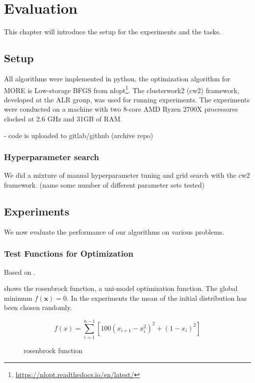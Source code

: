 
\chapter{Evaluation}
This chapter will introduce the setup for the experiments and the tasks.

\section{Setup}
All algorithms were implemented in python,
the optimization algorithm for MORE is Low-storage BFGS
from nlopt\footnote{\href{https://nlopt.readthedocs.io/en/latest/}{https://nlopt.readthedocs.io/en/latest/}}.
The clusterwork2 (cw2) framework, developed at the ALR group, was used for running experiments.
The experiments were conducted on a machine with two 8-core
AMD Ryzen 2700X processores clocked at 2.6 GHz and 31GB of RAM.

- code is uploaded to gitlab/github (archive repo)

\subsection{Hyperparameter search}
We did a mixture of manual hyperparameter tuning and grid search
with the cw2 framework. (name some number of different parameter
sets tested)

\section{Experiments}
We now evaluate the performance of our algorithms on various problems.

\subsection{Test Functions for Optimization}
Based on \citet{molga2005test}.

 shows the rosenbrock function, a uni-model optimization function. The global minimum $f(\mathbf{x}) = 0$. In the experiments
the mean of the initial distribution has been chosen randomly.

$$ f(x) = \sum^{n-1}_{i=1} [100(x_{i+1} - x_i^2)^2 + (1-x_i)^2] $$

\begin{figure}[ht!]
    \centering
    \caption{rosenbrock function}
    \label{fig:rosenbrock}
\end{figure}

